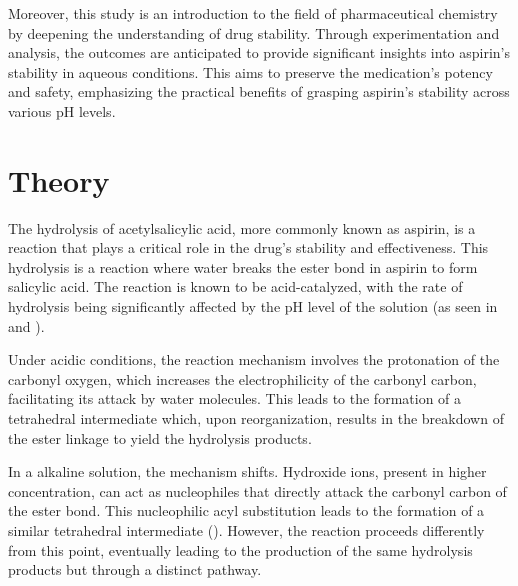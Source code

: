 \documentclass{article}
\begin{document}
Moreover, this study is an introduction to the field of pharmaceutical chemistry by deepening the understanding of drug stability. Through experimentation and analysis, the outcomes are anticipated to provide significant insights into aspirin's stability in aqueous conditions. This aims to preserve the medication's potency and safety, emphasizing the practical benefits of grasping aspirin's stability across various pH levels.

\section{Theory}
The hydrolysis of acetylsalicylic acid, more commonly known as aspirin, is a reaction that plays a critical role in the drug's stability and effectiveness. This hydrolysis is a reaction where water breaks the ester bond in aspirin to form salicylic acid. The reaction is known to be acid-catalyzed, with the rate of hydrolysis being significantly affected by the pH level of the solution (as seen in \cite{fersht1967hydrolysis} and \cite{RCSpaperexperiment}).

Under acidic conditions, the reaction mechanism involves the protonation of the carbonyl oxygen, which increases the electrophilicity of the carbonyl carbon, facilitating its attack by water molecules. This leads to the formation of a tetrahedral intermediate which, upon reorganization, results in the breakdown of the ester linkage to yield the hydrolysis products.

In a alkaline solution, the mechanism shifts. Hydroxide ions, present in higher concentration, can act as nucleophiles that directly attack the carbonyl carbon of the ester bond. This nucleophilic acyl substitution leads to the formation of a similar tetrahedral intermediate (\cite{chembook}). However, the reaction proceeds differently from this point, eventually leading to the production of the same hydrolysis products but through a distinct pathway.
\end{document}
